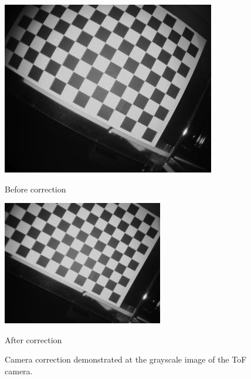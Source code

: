 \begin{figure}[H]
    \centering
    \begin{minipage}[b]{0.45\textwidth}
      \includegraphics[scale=0.70]{images/camcalib_source.jpg}
      \caption{Before correction}
      \label{fig:heightmapdots} 
    \end{minipage} %
    \begin{minipage}[b]{0.45\textwidth}
      \includegraphics[scale=0.70]{images/camcalib_result.png} 
      \caption{After correction}
      \label{fig:bothobjects} 
    \end{minipage}
    \caption{Camera correction demonstrated at the grayscale image of the ToF camera.}
    \label{fig.videodisplay}
  \end{figure}
